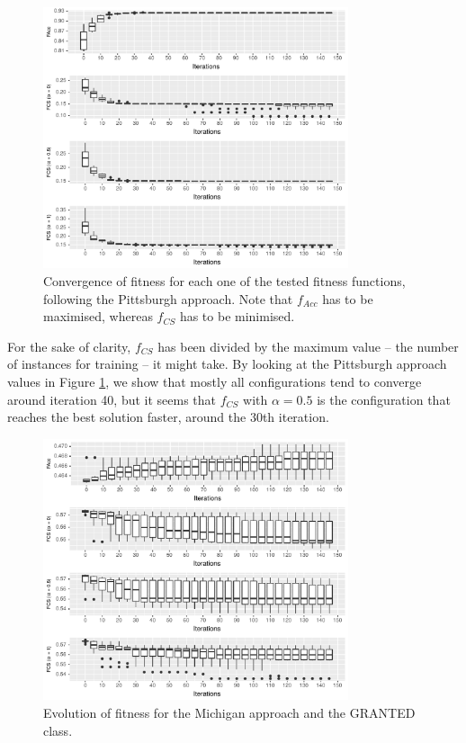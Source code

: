 \documentclass[runningheads]{llncs}
\begin{document}
\begin{figure}[h!tb]
\centering
\includegraphics[width=0.8\textwidth]{img/pittsburghItvsF.pdf}
\caption{Convergence of fitness for each one of the tested fitness
  functions, following the Pittsburgh approach. Note that $f_{Acc}$ has to
  be maximised, whereas $f_{CS}$ has to be minimised.}
\label{fig:pittsburghItvsF}
\end{figure}
%
For the sake of clarity, $f_{CS}$ has been divided by the maximum
value -- the number of instances for training -- it might take. By
looking at the Pittsburgh approach values in Figure
\ref{fig:pittsburghItvsF}, we show that mostly all configurations tend to converge around iteration 40, but it seems that $f_{CS}$ with
$\alpha = 0.5$ is the configuration that reaches the best solution
faster, around the 30th iteration.  

\begin{figure}[h!tb]
	\centering
	\includegraphics[width=0.8\textwidth]{img/michiganItvsF_allow.pdf}
	\caption{Evolution of fitness for the Michigan approach and the GRANTED class.}
	\label{fig:michiganItvsF_allow}
\end{figure}
\end{document}
